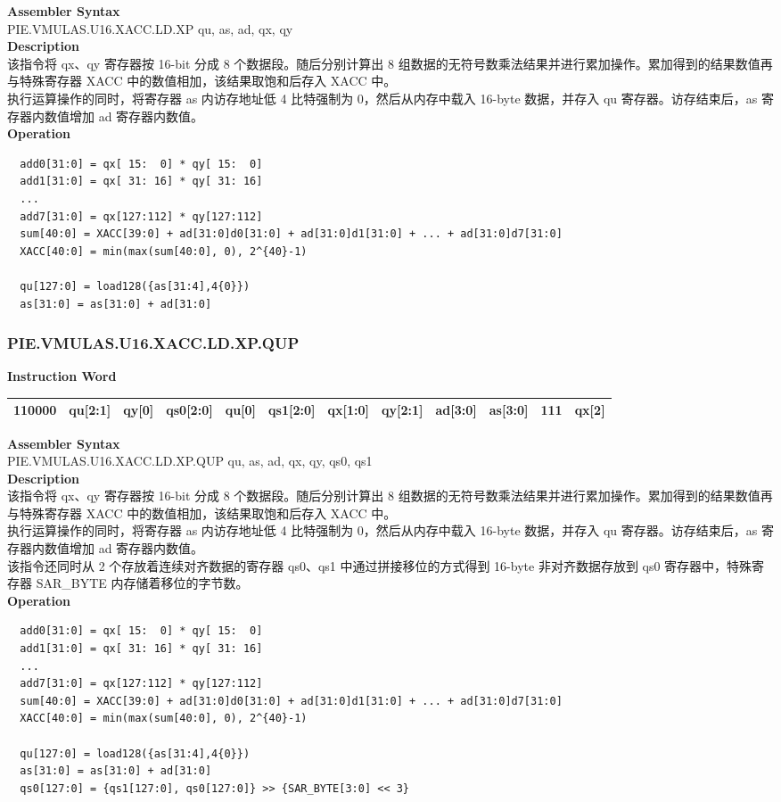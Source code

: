 \textbf{Assembler Syntax} \\
PIE.VMULAS.U16.XACC.LD.XP qu, as, ad, qx, qy \\
\textbf{Description} \\
该指令将 qx、qy 寄存器按 16-bit 分成 8 个数据段。随后分别计算出 8 组数据的无符号数乘法结果并进行累加操作。累加得到的结果数值再与特殊寄存器 XACC 中的数值相加，该结果取饱和后存入 XACC 中。\\
执行运算操作的同时，将寄存器 as 内访存地址低 4 比特强制为 0，然后从内存中载入 16-byte 数据，并存入 qu 寄存器。访存结束后，as 寄存器内数值增加 ad 寄存器内数值。\\
\textbf{Operation}
\begin{lstlisting}
  add0[31:0] = qx[ 15:  0] * qy[ 15:  0]
  add1[31:0] = qx[ 31: 16] * qy[ 31: 16]
  ...
  add7[31:0] = qx[127:112] * qy[127:112]
  sum[40:0] = XACC[39:0] + ad[31:0]d0[31:0] + ad[31:0]d1[31:0] + ... + ad[31:0]d7[31:0]
  XACC[40:0] = min(max(sum[40:0], 0), 2^{40}-1)

  qu[127:0] = load128({as[31:4],4{0}})
  as[31:0] = as[31:0] + ad[31:0]
\end{lstlisting}

\newpage
\subsubsection{PIE.VMULAS.U16.XACC.LD.XP.QUP}\label{instruction:PIEVMULASU16XACCLDXPQUP}
\setlength\tabcolsep{6pt}
\textbf{Instruction Word} \\
\begin{tabular}{|c|c|c|c|c|c|c|c|c|c|c|c|}
	\hline
	110000 & qu[2:1] & qy[0] & qs0[2:0] & qu[0] & qs1[2:0] & qx[1:0] & qy[2:1] & ad[3:0] & as[3:0] & 111 & qx[2] \\
	\hline
\end{tabular}

\textbf{Assembler Syntax} \\
PIE.VMULAS.U16.XACC.LD.XP.QUP qu, as, ad, qx, qy, qs0, qs1 \\
\textbf{Description} \\
该指令将 qx、qy 寄存器按 16-bit 分成 8 个数据段。随后分别计算出 8 组数据的无符号数乘法结果并进行累加操作。累加得到的结果数值再与特殊寄存器 XACC 中的数值相加，该结果取饱和后存入 XACC 中。\\
执行运算操作的同时，将寄存器 as 内访存地址低 4 比特强制为 0，然后从内存中载入 16-byte 数据，并存入 qu 寄存器。访存结束后，as 寄存器内数值增加 ad 寄存器内数值。\\
该指令还同时从 2 个存放着连续对齐数据的寄存器 qs0、qs1 中通过拼接移位的方式得到 16-byte 非对齐数据存放到 qs0 寄存器中，特殊寄存器 SAR\_BYTE 内存储着移位的字节数。\\
\textbf{Operation}
\begin{lstlisting}
  add0[31:0] = qx[ 15:  0] * qy[ 15:  0]
  add1[31:0] = qx[ 31: 16] * qy[ 31: 16]
  ...
  add7[31:0] = qx[127:112] * qy[127:112]
  sum[40:0] = XACC[39:0] + ad[31:0]d0[31:0] + ad[31:0]d1[31:0] + ... + ad[31:0]d7[31:0]
  XACC[40:0] = min(max(sum[40:0], 0), 2^{40}-1)

  qu[127:0] = load128({as[31:4],4{0}})
  as[31:0] = as[31:0] + ad[31:0]
  qs0[127:0] = {qs1[127:0], qs0[127:0]} >> {SAR_BYTE[3:0] << 3}
\end{lstlisting}

